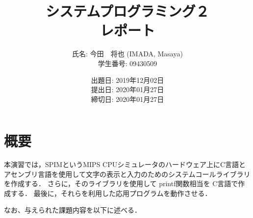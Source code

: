 \documentclass[a4j,11pt]{jarticle}
\title{システムプログラミング２ \\
       レポート}
\author{氏名: 今田　将也 (IMADA, Masaya) \\
        学生番号: 09430509}
\date{出題日: 2019年12月02日 \\
      提出日: 2020年01月27日 \\
      締切日: 2020年01月27日 \\}  %
\begin{document}
\maketitle


\section{概要} \label{chap:abstract}

本演習では，SPIMというMIPS CPUシミュレータのハードウェア上にC言語とアセンブリ言語を使用して文字の表示と入力のためのシステムコールライブラリを作成する． さらに，そのライブラリを使用して printf関数相当を C言語で作成する． 最後に，それらを利用した応用プログラムを動作させる．

なお、与えられた課題内容を以下に述べる．
\end{document}
